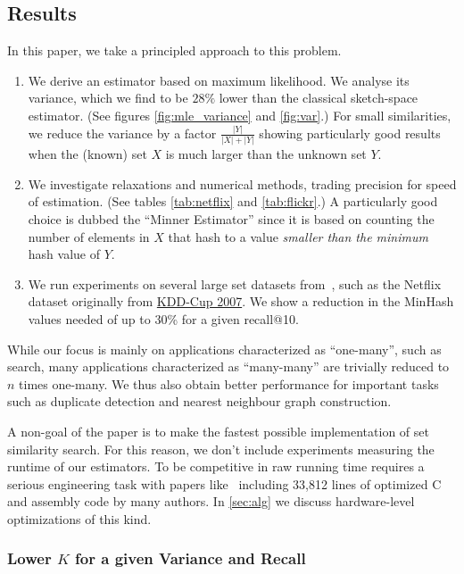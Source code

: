 \subsection{Results}

In this paper, we take a principled approach to this problem.
\begin{enumerate}
   \item We derive an estimator based on maximum likelihood.
      We analyse its variance, which we find to be $28\%$ lower than the classical sketch-space estimator.
      (See figures \ref{fig:mle_variance} and \ref{fig:var}.)
      For small similarities, we reduce the variance by a factor $\frac{|Y|}{|X|+|Y|}$ showing particularly good results when the (known) set $X$ is much larger than the unknown set $Y$.
   \item We investigate relaxations and numerical methods, trading precision for speed of estimation. (See tables \ref{tab:netflix} and \ref{tab:flickr}.)
      A particularly good choice is dubbed the ``Minner Estimator'' since it is based on counting the number of elements in $X$ that hash to a value \emph{smaller than the minimum} hash value of $Y$.
   \item We run experiments on several large set datasets from~\cite{mann2016empirical},
      such as the Netflix dataset originally from \href{https://www.cs.uic.edu/~liub/Netflix-KDD-Cup-2007.html}{KDD-Cup 2007}.
      We show a reduction in the MinHash values needed of up to 30\% for a given recall@10.
\end{enumerate}

While our focus is mainly on applications characterized as ``one-many'', such as search, many applications characterized as ``many-many'' are trivially reduced to $n$ times one-many.
We thus also obtain better performance for important tasks such as duplicate detection and nearest neighbour graph construction.

A non-goal of the paper is to make the fastest possible implementation of set similarity search.
For this reason, we don't include experiments measuring the runtime of our estimators.
To be competitive in raw running time requires a serious engineering task with papers like~\cite{guo2020accelerating} including 33,812 lines of optimized C and assembly code by many authors.
In \cref{sec:alg} we discuss hardware-level optimizations of this kind.

\subsubsection{Lower $K$ for a given Variance and Recall}

